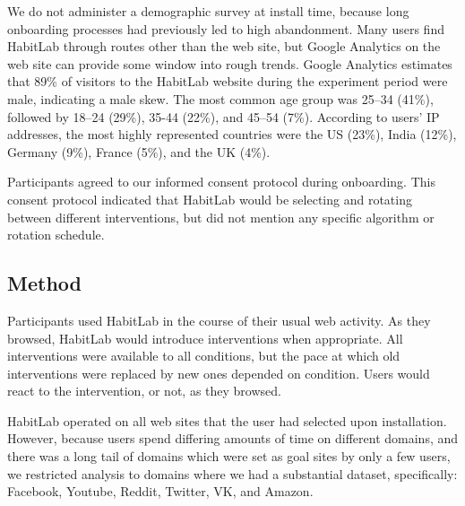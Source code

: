 

We do not administer a demographic survey at install time, because long onboarding processes had previously led to high abandonment. Many users find HabitLab through routes other than the web site, but Google Analytics on the web site can provide some window into rough trends. Google Analytics estimates that 89\% of visitors to the HabitLab website during the experiment period were male, indicating a male skew. The most common age group was 25--34 (41\%), followed by 18--24 (29\%), 35-44 (22\%), and 45--54 (7\%). According to users' IP addresses, the most highly represented countries were the US (23\%), India (12\%), Germany (9\%), France (5\%), and the UK (4\%).


Participants agreed to our informed consent protocol during onboarding. This consent protocol indicated that HabitLab would be selecting and rotating between different interventions, but did not mention any specific algorithm or rotation schedule.

\subsection{Method}

Participants used HabitLab in the course of their usual web activity. As they browsed, HabitLab would introduce interventions when appropriate. All interventions were available to all conditions, but the pace at which old interventions were replaced by new ones depended on condition. Users would react to the intervention, or not, as they browsed. %

HabitLab operated on all web sites that the user had selected upon installation. However, because users spend differing amounts of time on different domains, and there was a long tail of domains which were set as goal sites by only a few users, we restricted analysis to domains where we had a substantial dataset, specifically: Facebook, Youtube, Reddit, Twitter, VK, and Amazon. %


